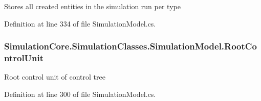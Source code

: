 Stores all created entities in the simulation run per type 



Definition at line 334 of file Simulation\+Model.\+cs.

\subsubsection[{\texorpdfstring{Root\+Control\+Unit}{RootControlUnit}}]{ Simulation\+Core.\+Simulation\+Classes.\+Simulation\+Model.\+Root\+Control\+Unit\hspace{0.3cm}{\ttfamily [get]}}\hypertarget{class_simulation_core_1_1_simulation_classes_1_1_simulation_model_adc6ff3791a65c144a03da32307e438e8}{}\label{class_simulation_core_1_1_simulation_classes_1_1_simulation_model_adc6ff3791a65c144a03da32307e438e8}


Root control unit of control tree 



Definition at line 300 of file Simulation\+Model.\+cs.

